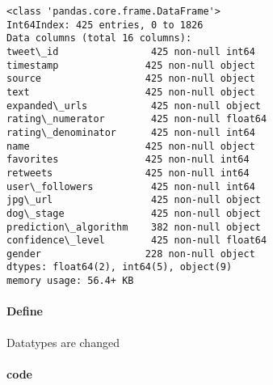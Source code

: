 \documentclass[11pt]{article}
\begin{document}
    \begin{Verbatim}[commandchars=\\\{\}]
<class 'pandas.core.frame.DataFrame'>
Int64Index: 425 entries, 0 to 1826
Data columns (total 16 columns):
tweet\_id                425 non-null int64
timestamp               425 non-null object
source                  425 non-null object
text                    425 non-null object
expanded\_urls           425 non-null object
rating\_numerator        425 non-null float64
rating\_denominator      425 non-null int64
name                    425 non-null object
favorites               425 non-null int64
retweets                425 non-null int64
user\_followers          425 non-null int64
jpg\_url                 425 non-null object
dog\_stage               425 non-null object
prediction\_algorithm    382 non-null object
confidence\_level        425 non-null float64
gender                  228 non-null object
dtypes: float64(2), int64(5), object(9)
memory usage: 56.4+ KB
    \end{Verbatim}

    \hypertarget{define}{%
\paragraph{Define}\label{define}}

Datatypes are changed

    \hypertarget{code}{%
\paragraph{code}\label{code}}
\end{document}
